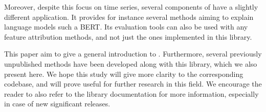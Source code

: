 Moreover, despite this focus on time series, several components of \texttt{} have a slightly
different application.
It provides for instance several methods aiming to explain language models such a BERT\@.
Its evaluation tools can also be used with any feature attribution methods, and not just the ones implemented in
this library.

This paper aim to give a general introduction to \texttt{}.
Furthermore, several previously unpublished methods have been developed along with this library, which we also present
here.
We hope this study will give more clarity to the corresponding codebase, and will prove useful for further research
in this field.
We encourage the reader to also refer to the library documentation for more information, especially in case of
new significant releases.